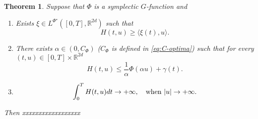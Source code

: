 \documentclass[twoside]{article}
\makeatletter
\newtheorem{thm}{Theorem}[section]
\theoremstyle{remark}
\newcommand{\labitem}[2]{%
\def\@itemlabel{#1}
\item
\def\@currentlabel{#1}\label{#2}}
\newcommand{\lpsi}{L^{\Phi^{\star}}}
\newcommand{\rr}{\mathbb{R}}
\renewcommand{\leq}{\leqslant}
\renewcommand{\geq}{\geqslant}
\makeatother
\begin{document}
\begin{thm}\label{thm:solution-ham} Suppose that $\Phi$ is a symplectic $G$-function and
\begin{enumerate}
 \labitem{H1)}{it:hip1}   Exists $\xi\in\lpsi([0,T],\rr^{2d})$ such that 
 \[H(t,u)\geq \langle \xi(t), u\rangle.
  \]
 \labitem{H2)}{it:hip2} There exists $\alpha\in (0,C_{\Phi})$ ($C_{\Phi}$ is   defined in \eqref{eq:C-optima}) such that for every $(t,u)\in [0,T]\times\rr^{2d}$
 \[
  H(t,u)\leq \frac{1}{\alpha}\Phi\left( \alpha u\right)+\gamma(t).
 \]
 \labitem{H3)}{it:hip3} 
 \[
  \int_0^TH(t,u)dt\to+\infty,\quad\hbox{when } |u|\to+\infty.
 \]

\end{enumerate}

Then xxxxxxxxxxxxxxxxxx

\end{thm}
\end{document}
